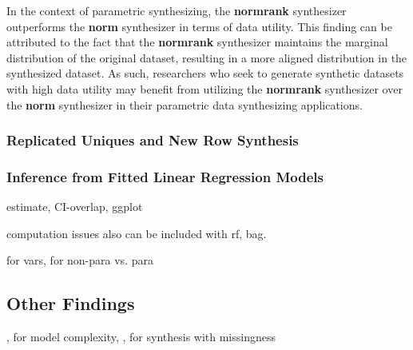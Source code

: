 In the context of parametric synthesizing, the \textbf{normrank} synthesizer outperforms the \textbf{norm} synthesizer in terms of data utility. This finding can be attributed to the fact that the \textbf{normrank} synthesizer maintains the marginal distribution of the original dataset, resulting in a more aligned distribution in the synthesized dataset. As such, researchers who seek to generate synthetic datasets with high data utility may benefit from utilizing the \textbf{normrank} synthesizer over the \textbf{norm} synthesizer in their parametric data synthesizing applications.

\subsubsection{Replicated Uniques and New Row Synthesis}
\label{subsubsec:sde}

\subsubsection{Inference from Fitted Linear Regression Models}
\label{subsubsec:inferencelm}
estimate, CI-overlap, ggplot

computation issues also can be included with rf, bag.

for vars, for non-para vs. para
\subsection{Other Findings}
\label{subsec:findings}
, for model complexity, , for synthesis with missingness